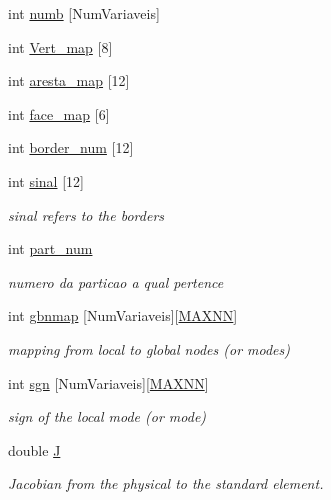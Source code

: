 \begin{DoxyCompactItemize}
int \hyperlink{classPhElem_ad95c9f8ee7a993ccc7f9cdd08dddf5f6}{numb} \mbox{[}Num\+Variaveis\mbox{]}
\item 
int \hyperlink{classPhElem_a07f19f862b13cc9c5f80271b03a5a023}{Vert\+\_\+map} \mbox{[}8\mbox{]}
\item 
int \hyperlink{classPhElem_a27a4f856d62b68758e4c03c09b4c37f8}{aresta\+\_\+map} \mbox{[}12\mbox{]}
\item 
int \hyperlink{classPhElem_a300b484c07390b9016d9ed97980d76b3}{face\+\_\+map} \mbox{[}6\mbox{]}
\item 
int \hyperlink{classPhElem_ad153ce0aef191aac0f28f2addd213c71}{border\+\_\+num} \mbox{[}12\mbox{]}
\item 
int \hyperlink{classPhElem_a4034b9b2a458d1277ca74e4e8a49627e}{sinal} \mbox{[}12\mbox{]}
\begin{DoxyCompactList}\small\item\em sinal refers to the borders \end{DoxyCompactList}\item 
int \hyperlink{classPhElem_a141616ccadb4a17328626befc4330932}{part\+\_\+num}
\begin{DoxyCompactList}\small\item\em numero da particao a qual pertence \end{DoxyCompactList}\item 
int \hyperlink{classPhElem_ab27e9040a72ec923a90cffb25f5b0c15}{gbnmap} \mbox{[}Num\+Variaveis\mbox{]}\mbox{[}\hyperlink{MyOptions_8h_a2f91e7a0b4bf68a62a0f3d38904dea2c}{M\+A\+X\+NN}\mbox{]}
\begin{DoxyCompactList}\small\item\em mapping from local to global nodes (or modes) \end{DoxyCompactList}\item 
int \hyperlink{classPhElem_a5bb9ccd4ccebf12ff0937d807c443caf}{sgn} \mbox{[}Num\+Variaveis\mbox{]}\mbox{[}\hyperlink{MyOptions_8h_a2f91e7a0b4bf68a62a0f3d38904dea2c}{M\+A\+X\+NN}\mbox{]}
\begin{DoxyCompactList}\small\item\em sign of the local mode (or mode) \end{DoxyCompactList}\item 
double \hyperlink{classPhElem_a27acf6bc6ac9eaf94a7cce52522b3b92}{J}
\begin{DoxyCompactList}\small\item\em Jacobian from the physical to the standard element. \end{DoxyCompactList}\item 

\end{DoxyCompactItemize}
